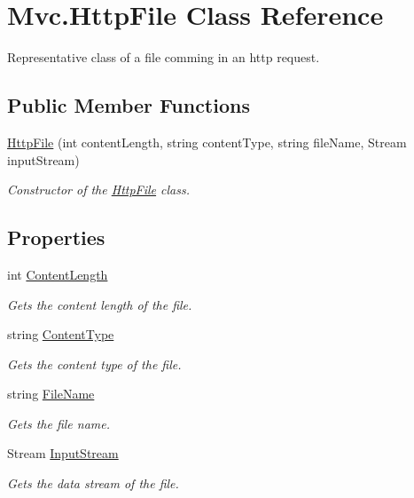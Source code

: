 \hypertarget{class_mvc_1_1_http_file}{}\section{Mvc.\+Http\+File Class Reference}
\label{class_mvc_1_1_http_file}


Representative class of a file comming in an http request.  


\subsection*{Public Member Functions}
\begin{DoxyCompactItemize}
\item 
\hyperlink{class_mvc_1_1_http_file_a5a1c81ce7faef7de0719d464196854d6}{Http\+File} (int content\+Length, string content\+Type, string file\+Name, Stream input\+Stream)
\begin{DoxyCompactList}\small\item\em Constructor of the \hyperlink{class_mvc_1_1_http_file}{Http\+File} class. \end{DoxyCompactList}\end{DoxyCompactItemize}
\subsection*{Properties}
\begin{DoxyCompactItemize}
\item 
int \hyperlink{class_mvc_1_1_http_file_a1a279800b9291c4d423de7243a3747ef}{Content\+Length}
\begin{DoxyCompactList}\small\item\em Gets the content length of the file. \end{DoxyCompactList}\item 
string \hyperlink{class_mvc_1_1_http_file_aa7581b50f6fa1332ec39995a4a1f71fa}{Content\+Type}
\begin{DoxyCompactList}\small\item\em Gets the content type of the file. \end{DoxyCompactList}\item 
string \hyperlink{class_mvc_1_1_http_file_ac87b6e303321d6168c949aa671e8fbab}{File\+Name}
\begin{DoxyCompactList}\small\item\em Gets the file name. \end{DoxyCompactList}\item 
Stream \hyperlink{class_mvc_1_1_http_file_aafd93d89d0f3dd9526623810bb55a989}{Input\+Stream}
\begin{DoxyCompactList}\small\item\em Gets the data stream of the file. \end{DoxyCompactList}\end{DoxyCompactItemize}


